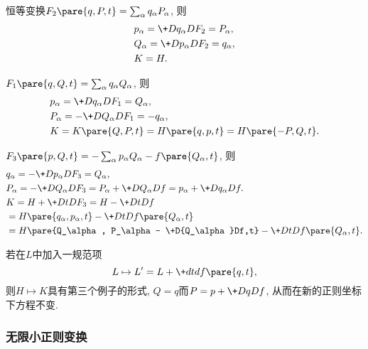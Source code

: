 \documentclass{ctexart}
\begin{document}
\begin{cenum}
    \item 恒等变换$F_2\pare{q,P,t} = \sum_\alpha q_\alpha P_\alpha$, 则
    \begin{align*}
        & p_\alpha = \+D{q_\alpha}D{F_2} = P_\alpha, \\
        & Q_\alpha = \+D{p_\alpha}D{F_2} = q_\alpha, \\
        & K = H.
    \end{align*}
    \item $F_1\pare{q,Q,t} = \sum_\alpha q_\alpha Q_\alpha$, 则
    \begin{align*}
        & p_\alpha = \+D{q_\alpha}D{F_1} = Q_\alpha, \\
        & P_\alpha = -\+D{Q_\alpha}D{F_1} = -q_\alpha, \\
        & K = K\pare{Q,P,t} = H\pare{q,p,t} = H\pare{-P,Q,t}.
    \end{align*}
    \item $F_3\pare{p,Q,t} = -\sum_\alpha p_\alpha Q_\alpha - f\pare{Q_\alpha,t}$, 则
    \begin{align*}
        & q_\alpha = -\+D{p_\alpha}D{F_3} = Q_\alpha, \\
        & P_\alpha = -\+D{Q_\alpha}D{F_3} = P_\alpha + \+D{Q_\alpha}Df = p_\alpha + \+D{q_\alpha}Df. \\
        & K = H + \+DtD{F_3} = H - \+DtDf \\
        &= H\pare{q_\alpha,p_\alpha,t} - \+DtD{f\pare{Q_\alpha,t}} \\
        &= H\pare{Q_\alpha, P_\alpha - \+D{Q_\alpha}Df,t} - \+DtD{f\pare{Q_\alpha,t}}.
    \end{align*}
\end{cenum}
\begin{remark}
    若在$L$中加入一规范项
    \[ L \mapsto L' = L + \+dtd{f\pare{q,t}}, \]
    则$H\mapsto K$具有第三个例子的形式, $Q=q$而$P=\displaystyle p+\+D{q}Df$, 从而在新的正则坐标下方程不变.
\end{remark}


\subsubsection{无限小正则变换} %
\label{ssub:无限小正则变换}
\end{document}
